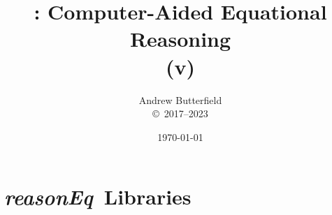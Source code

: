 \documentclass[fleqn,10pt]{report}
\author{
Andrew Butterfield
\\
{\small \copyright\ 2017--2023}
}
\title{
  \reasonEq: Computer-Aided Equational Reasoning
  \\(v\reqVersion)
}
\date{
\today
}
\def\reasonEq{\textit{\textsf{reasonEq}}}
\begin{document}
\maketitle
\setcounter{tocdepth}{1}
\tableofcontents

\part{\reasonEq\ Libraries}

\newpage
\newpage

% 



%
\end{document}
